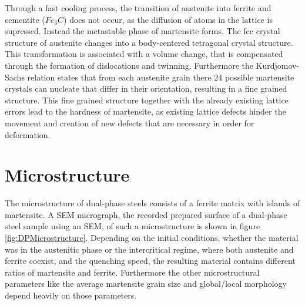 Through a fast cooling process, the transition of austenite into ferrite and cementite ($Fe_3C$) does not occur, as the diffusion of atoms in the lattice is supressed. Instead the metastable phase of martensite forms. The fcc crystal structure of austenite changes into a body-centered tetragonal crystal structure. This transformation is associated with a volume change, that is compensated through the formation of dislocations and twinning. Furthermore the Kurdjomov-Sachs relation states that from each austenite grain there $24$ possible martensite crystals can nucleate that differ in their orientation, resulting in a fine grained structure. This fine grained structure together with the already existing lattice errors lead to the hardness of martensite, as existing lattice defects hinder the movement and creation of new defects that are necessary in order for deformation.
%



\section{Microstructure}

The microstructure of dual-phase steels consists of a ferrite matrix with islands of martensite. A SEM micrograph, the recorded prepared surface of a dual-phase steel sample using an SEM, of such a microstructure is shown in figure \ref{fig:DPMicrostructure}. Depending on the initial conditions, whether the material was in the austenitic phase or the intercritical regime, where both austenite and ferrite coexist, and the quenching speed, the resulting material contains different ratios of martensite and ferrite. Furthermore the other microstructural parameters like the average martensite grain size and global/local morphology depend heavily on those parameters.  


